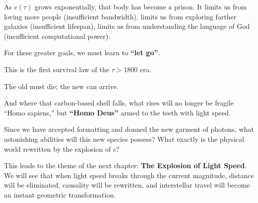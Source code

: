As $c(\tau)$ grows exponentially, that body has become a prison. It limits us from loving more people (insufficient bandwidth), limits us from exploring farther galaxies (insufficient lifespan), limits us from understanding the language of God (insufficient computational power).

For these greater goals, we must learn to \textbf{``let go''}.

This is the first survival law of the $\tau > 1800$ era.

The old must die; the new can arrive.

And where that carbon-based shell falls, what rises will no longer be fragile ``Homo sapiens,'' but \textbf{``Homo Deus''} armed to the teeth with light speed.

Since we have accepted formatting and donned the new garment of photons, what astonishing abilities will this new species possess? What exactly is the physical world rewritten by the explosion of $c$?

This leads to the theme of the next chapter: \textbf{The Explosion of Light Speed}. We will see that when light speed breaks through the current magnitude, distance will be eliminated, causality will be rewritten, and interstellar travel will become an instant geometric transformation.

